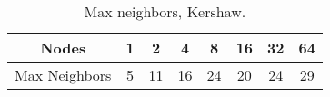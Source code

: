 \begin{table}
\centering
\begin{tabular}{|| c | c c c c c c c ||}
\hline
Nodes & 1 & 2 & 4 & 8 & 16 & 32 & 64\\
\hline
Max Neighbors & 5 & 11 & 16 & 24 & 20 & 24 & 29\\
\hline
\end{tabular}
\caption{
  \small
  Max neighbors, Kershaw.
  \label{table:max-neighbors}
}
\end{table}
